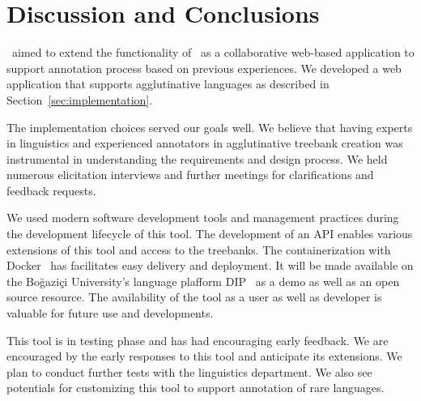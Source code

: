 \section{Discussion and Conclusions}
\label{sec:discussion}

\boatvtwo\ aimed to  extend the functionality of \boatvone\ as a collaborative web-based application to support annotation process based on previous experiences. 
We developed a web application that supports agglutinative languages as described in Section~\ref{sec:implementation}. 

The implementation choices served our goals well. 
We believe that having experts in linguistics and experienced annotators in agglutinative treebank creation was instrumental in understanding the requirements and design process. 
We held numerous elicitation interviews and further meetings for clarifications and feedback requests.

We used modern software development tools and management practices during the development lifecycle of this tool.
The development of an API enables various extensions of this tool and access to the treebanks.  
The containerization with Docker~\cite{docker} has facilitates easy delivery and deployment.
It will be made available on the Boğaziçi University's language plafform DIP~\cite{DIP} as a demo as well as an open source resource.
The availability of the tool as a user as well as developer is valuable for future use and developments. 


This tool is in testing phase and has had encouraging early feedback.
We are encouraged by the early responses to this tool and anticipate its extensions.
We plan to conduct further tests with the linguistics department. 
We also see potentials for customizing this tool to support annotation of rare languages.
